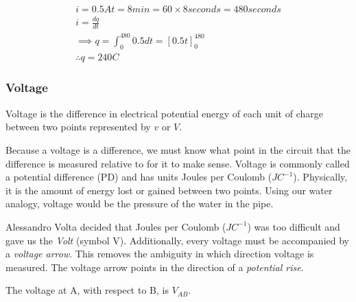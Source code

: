 \documentclass[12pt]{article}
\begin{document}
\begin{example}
  \begin{gather*}
    i = 0.5\unit{A } 
    t = 8\unit{min} = 60 \times 8 \unit{seconds} = 480\unit{seconds} \\
    i = \frac{dq}{dt} \\
    \implies q = \int_0^{480}0.5dt = [0.5t]_0^{480} \\
    \therefore q = 240\unit{C}
  \end{gather*}
\end{example}

\subsubsection{Voltage}
\begin{definition*}
  Voltage is the difference in electrical potential energy of each unit of charge between two points represented by $v$ or $V$.
\end{definition*}

Because a voltage is a difference, we must know what point in the circuit that the difference is measured relative to for it to make sense.
Voltage is commonly called a potential difference (PD) and has units Joules per Coulomb ($\unit{JC}^{-1}$).
Physically, it is the amount of energy lost or gained between two points. 
Using our water analogy, voltage would be the pressure of the water in the pipe.

Alessandro Volta decided that Joules per Coulomb ($\unit{JC}^{-1}$) was too difficult and gave us the \textit{Volt} (symbol V).
Additionally, every voltage must be accompanied by a \textit{voltage arrow}. 
This removes the ambiguity in which direction voltage is measured. 
The voltage arrow points in the direction of a \textit{potential rise}.

The voltage at A, with respect to B, is $V_{AB}$. 
\end{document}
